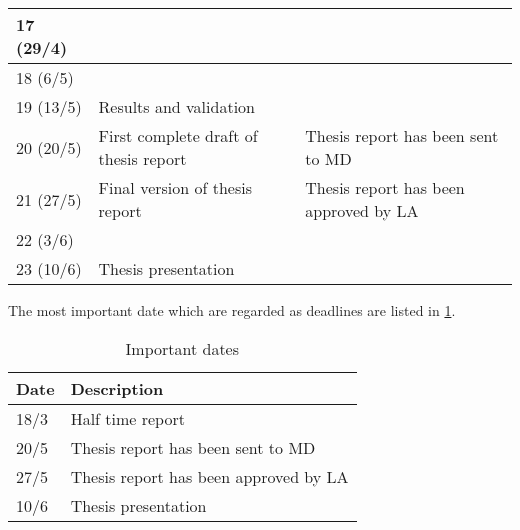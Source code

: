 \begin{table}[H]
\begin{tabular}{|p{}|p{}|p{}|}
	17 (29/4)            &                                       &  \\ \hline
	18 (6/5)             &                                       &  \\ \hline
	19 (13/5)            & Results and validation                &  \\ \hline
	20 (20/5)            & First complete draft of thesis report & Thesis report has been sent to MD                                                                                                     \\ \hline
	21 (27/5)            & Final version of thesis report        & Thesis report has been approved by LA                                                                                                 \\ \hline
	22 (3/6)             &                                       &  \\ \hline
	23 (10/6)            & Thesis presentation                   &  \\ \hline
\end{tabular}
\end{table}

The most important date which are regarded as deadlines are listed in \cref{table:dates}.


\begin{table}[H]
	\centering
	\caption{Important dates}
	\label{table:dates}
	\begin{tabular}{|p{}|p{}|}
		\hline
		\textbf{Date} & \textbf{Description}                  \\ \hline
		18/3          & Half time report                      \\ \hline
		20/5          & Thesis report has been sent to MD     \\ \hline
		27/5          & Thesis report has been approved by LA \\ \hline
		10/6          & Thesis presentation                   \\ \hline
	\end{tabular}
\end{table}


